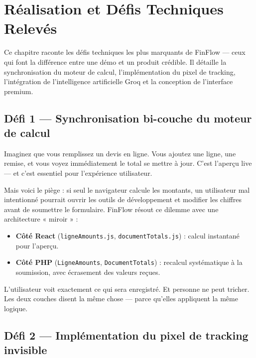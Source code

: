 \documentclass[12pt,a4paper]{report}
\begin{document}
\chapter{Réalisation et Défis Techniques Relevés}
\label{ch:realisation}

Ce chapitre raconte les défis techniques les plus marquants de FinFlow --- ceux qui font la différence entre une démo et un produit crédible. Il détaille la synchronisation du moteur de calcul, l'implémentation du pixel de tracking, l'intégration de l'intelligence artificielle Groq et la conception de l'interface premium.

\section{Défi 1 — Synchronisation bi-couche du moteur de calcul}

Imaginez que vous remplissez un devis en ligne. Vous ajoutez une ligne, une remise, et vous voyez immédiatement le total se mettre à jour. C'est l'aperçu live --- et c'est essentiel pour l'expérience utilisateur.

Mais voici le piège : si seul le navigateur calcule les montants, un utilisateur mal intentionné pourrait ouvrir les outils de développement et modifier les chiffres avant de soumettre le formulaire. FinFlow résout ce dilemme avec une architecture « miroir » :

\begin{itemize}[leftmargin=*]
    \item \textbf{Côté React} (\texttt{ligneAmounts.js}, \texttt{documentTotals.js}) : calcul instantané pour l'aperçu.
    \item \textbf{Côté PHP} (\texttt{LigneAmounts}, \texttt{DocumentTotals}) : recalcul systématique à la soumission, avec écrasement des valeurs reçues.
\end{itemize}

L'utilisateur voit exactement ce qui sera enregistré. Et personne ne peut tricher. Les deux couches disent la même chose --- parce qu'elles appliquent la même logique.

\section{Défi 2 — Implémentation du pixel de tracking invisible}
\end{document}
